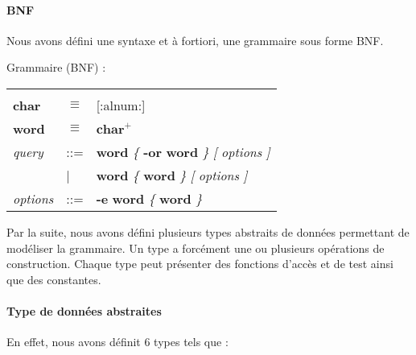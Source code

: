 \paragraph{BNF}
Nous avons défini une syntaxe et à fortiori, une grammaire sous forme BNF.

Grammaire (BNF) :\\
% 	 

\begin{tabular}{p{1.5cm} p{0.5cm} p{9cm} }
& & \\
\textbf{char} & $\equiv$ & [:alnum:]\\
\textbf{word} & $\equiv$ & $\textbf{char}^+$\\
\textit{query} & ::= & \textbf{word} \textit{\{} \textbf{-or} \textbf{word} \textit{\}} \textit{[} \textit{options} \textit{]}\\
& | & \textbf{word} \textit{\{} \textbf{word} \textit{\}} \textit{[} \textit{options} \textit{]}\\
\textit{options} & ::= & \textbf{-e} \textbf{word} \textit{\{} \textbf{word} \textit{\}}\\
\end{tabular}

Par la suite, nous avons défini plusieurs types abstraits de données permettant de modéliser la grammaire.
Un type a forcément une ou plusieurs opérations de construction. 
Chaque type peut présenter des fonctions d'accès et de test ainsi que des constantes.

\paragraph{Type de données abstraites}
En effet, nous avons définit 6 types tels que :


